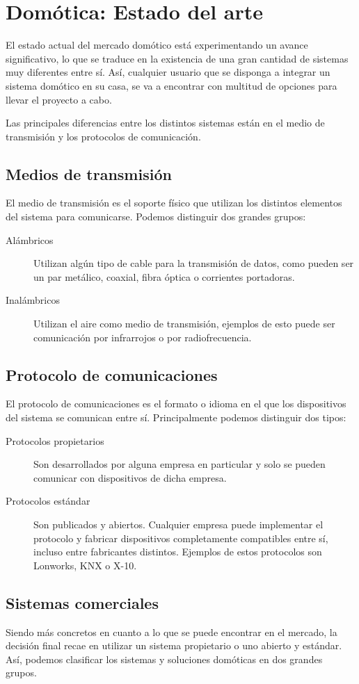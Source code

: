 \chapter{Dom\'otica: Estado del arte}
El estado actual del mercado dom\'otico est\'a experimentando un avance significativo, lo que se traduce en la existencia de una gran cantidad de sistemas muy diferentes entre sí. Así, cualquier usuario que se disponga a integrar un sistema domótico en su casa, se va a encontrar con multitud de opciones para llevar el proyecto a cabo.

Las principales diferencias entre los distintos sistemas est\'an en el medio de transmisión y los protocolos de comunicación.

\section{Medios de transmisión}
El medio de transmisión es el soporte físico que utilizan los distintos elementos del sistema para comunicarse. Podemos distinguir dos grandes grupos:
\begin{description}
	\item[Al\'ambricos]
Utilizan algún tipo de cable para la transmisión de datos, como pueden ser un par met\'alico, coaxial, fibra óptica o corrientes portadoras.
	\item [Inal\'ambricos]
Utilizan el aire como medio de transmisión, ejemplos de esto puede ser comunicación por infrarrojos o por radiofrecuencia.
\end{description}
\section{Protocolo de comunicaciones}
El protocolo de comunicaciones es el formato o idioma en el que los dispositivos del sistema se comunican entre sí. Principalmente podemos distinguir dos tipos:
\begin{description}
\item[Protocolos propietarios] Son desarrollados por alguna empresa en particular y solo se pueden comunicar con dispositivos de dicha empresa.
\item[Protocolos est\'andar] Son publicados y abiertos. Cualquier empresa puede implementar el protocolo y fabricar dispositivos completamente compatibles entre sí, incluso entre fabricantes distintos. Ejemplos de estos protocolos son Lonworks, KNX o X-10.
\end{description}

\section{Sistemas comerciales}
Siendo m\'as concretos en cuanto a lo que se puede encontrar en el mercado, la decisión final recae en utilizar un sistema propietario o uno abierto y est\'andar. Así, podemos clasificar los sistemas y soluciones domóticas en dos grandes grupos.
